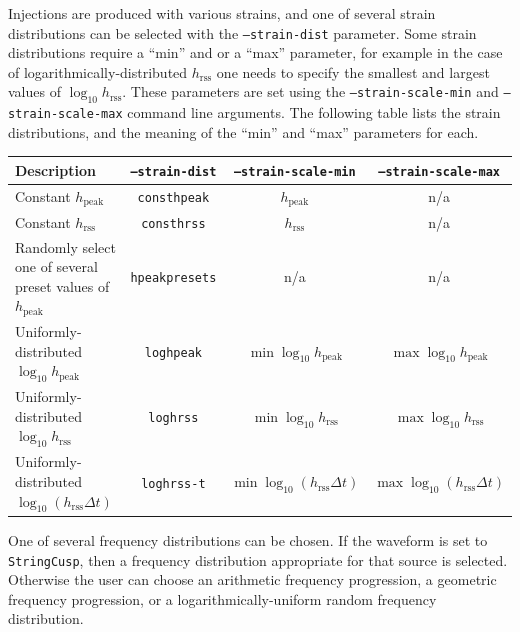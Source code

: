 \documentclass[10pt]{article}
\newcommand{\option}[1]{\texttt{#1}}
\newenvironment{entry}%
{\begin{list}{}{\renewcommand{\makelabel}[1]%
{\parbox[b]{\labelwidth}{\makebox[0pt][l]{\textbf{##1}}\\}}%
\setlength{\labelwidth}{1em}%
\setlength{\labelsep}{1em}%
\setlength{\leftmargin}{2em}%
\setlength{\topsep}{\medskipamount}%
\setlength{\itemsep}{\medskipamount}%
\setlength{\parsep}{\medskipamount}%
\setlength{\listparindent}{0pt}}}
{\end{list}}
\begin{document}
\begin{entry}
Injections are produced with various strains, and one of several strain
distributions can be selected with the \option{--strain-dist} parameter.
Some strain distributions require a ``min'' and or a ``max'' parameter, for
example in the case of logarithmically-distributed \(h_{\mathrm{rss}}\) one
needs to specify the smallest and largest values of \(\log_{10}
h_{\mathrm{rss}}\).  These parameters are set using the
\option{--strain-scale-min} and \option{--strain-scale-max} command line
arguments.  The following table lists the strain distributions, and the
meaning of the ``min'' and ``max'' parameters for each.
\begin{center}\begin{tabular}{p{.3\linewidth}ccc}
\hline\hline
Description & \option{--strain-dist} & \option{--strain-scale-min} &
\option{--strain-scale-max} \\
\hline
Constant \(h_{\mathrm{peak}}\) & \texttt{consthpeak} & \(h_{\mathrm{peak}}\) & n/a \\
Constant \(h_{\mathrm{rss}}\) & \texttt{consthrss} & \(h_{\mathrm{rss}}\) & n/a \\
Randomly select one of several preset values of \(h_{\mathrm{peak}}\) & \texttt{hpeakpresets} & n/a & n/a \\
Uniformly-distributed \(\log_{10} h_{\mathrm{peak}}\) & \texttt{loghpeak} & \(\min \log_{10} h_{\mathrm{peak}}\) & \(\max \log_{10} h_{\mathrm{peak}}\) \\
Uniformly-distributed \(\log_{10} h_{\mathrm{rss}}\) & \texttt{loghrss} & \(\min \log_{10} h_{\mathrm{rss}}\) & \(\max \log_{10} h_{\mathrm{rss}}\) \\
Uniformly-distributed \(\log_{10} (h_{\mathrm{rss}} \Delta t)\) & \texttt{loghrss-t} & \(\min \log_{10} (h_{\mathrm{rss}} \Delta t)\) & \(\max \log_{10} (h_{\mathrm{rss}} \Delta t)\) \\
\hline\hline
\end{tabular}\end{center}

One of several frequency distributions can be chosen.  If the waveform is
set to \texttt{StringCusp}, then a frequency distribution appropriate for
that source is selected.  Otherwise the user can choose an arithmetic
frequency progression, a geometric frequency progression, or a
logarithmically-uniform random frequency distribution.


\end{entry}
\end{document}
